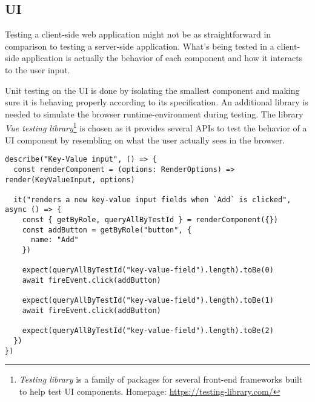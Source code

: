   \subsection{UI}

    Testing a client-side web application might not be as straightforward in comparison to testing a server-side application. What's being tested in a client-side application is actually the behavior of each component and how it interacts to the user input. 
    
    Unit testing on the UI is done by isolating the smallest component and making sure it is behaving properly according to its specification. An additional library is needed to simulate the browser runtime-environment during testing. The library \emph{Vue testing library}\footnote{\emph{Testing library} is a family of packages for several front-end frameworks built to help test UI components. Homepage: \url{https://testing-library.com/}} is chosen as it provides several APIs to test the behavior of a UI component by resembling on what the user actually sees in the browser. 

    \begin{lstlisting}[style=es6, caption={Example unit test of a UI component (TypeScript)}]
describe("Key-Value input", () => {
  const renderComponent = (options: RenderOptions) => render(KeyValueInput, options)
  
  it("renders a new key-value input fields when `Add` is clicked", async () => {
    const { getByRole, queryAllByTestId } = renderComponent({})
    const addButton = getByRole("button", {
      name: "Add" 
    })

    expect(queryAllByTestId("key-value-field").length).toBe(0)
    await fireEvent.click(addButton)

    expect(queryAllByTestId("key-value-field").length).toBe(1)
    await fireEvent.click(addButton)

    expect(queryAllByTestId("key-value-field").length).toBe(2)
  })
})
\end{lstlisting}